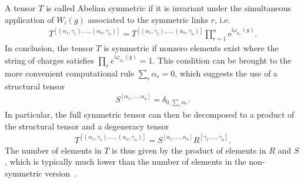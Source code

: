 \documentclass{svmono}
\def\ri{\mathrm i}
\def\re{\mathrm e}
\begin{document}
A tensor $T$ is called Abelian symmetric if it is invariant under the simultaneous application of $W_i(g)$ associated to the symmetric links $r$, i.e.
\begin{align}
    T^{[(\alpha_1,\gamma_1),\dots,(\alpha_n,\gamma_n)]} = T^{[(\alpha_1,\gamma_1),\dots,(\alpha_n,\gamma_n)]}\prod_{r=1}^n{\re^{\ri \varphi_{\alpha_r}(g)}}.
    \label{eq:symmetric_tensor}
\end{align}
In conclusion, the tensor $T$ is symmetric if nonzero elements exist where the string of charges satisfies $\prod_r {e^{\ri\varphi_{\alpha_r}(g)}} = 1$.
This condition can be brought to the more convenient computational rule $\sum_r\alpha_r = 0$, which suggests the use of a structural tensor~\cite{Silvi2019}
\begin{align}
    S^{[\alpha_1,\dots,\alpha_n]} = \delta_{0,\sum_r\alpha_r}.
\end{align}
In particular, the full symmetric tensor can then be decomposed to a product of the structural tensor and a degeneracy tensor
\begin{align}
    T^{[(\alpha_1,\gamma_1),\dots,(\alpha_n,\gamma_n)]} = S^{[\alpha_1,\dots,\alpha_n]} R^{[\gamma_1,\dots,\gamma_n]}.
\end{align}
The number of elements in $T$ is thus given by the product of elements in $R$ and $S$, which is typically much lower than the number of elements in the non-symmetric version~\cite{Silvi2019}.
\end{document}
